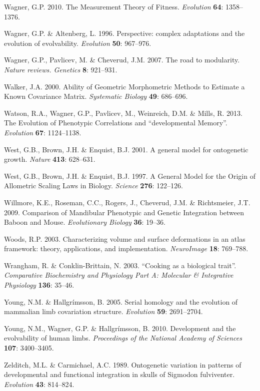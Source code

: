 \documentclass[12pt,twoside]{report}
\begin{document}
Wagner, G.P. 2010. The Measurement Theory of Fitness. \emph{Evolution}
\textbf{64}: 1358--1376.

Wagner, G.P. \& Altenberg, L. 1996. Perspective: complex adaptations and
the evolution of evolvability. \emph{Evolution} \textbf{50}: 967--976.

Wagner, G.P., Pavlicev, M. \& Cheverud, J.M. 2007. The road to
modularity. \emph{Nature reviews. Genetics} \textbf{8}: 921--931.

Walker, J.A. 2000. Ability of Geometric Morphometric Methods to Estimate
a Known Covariance Matrix. \emph{Systematic Biology} \textbf{49}:
686--696.

Watson, R.A., Wagner, G.P., Pavlicev, M., Weinreich, D.M. \& Mills, R.
2013. The Evolution of Phenotypic Correlations and ``developmental
Memory''. \emph{Evolution} \textbf{67}: 1124--1138.

West, G.B., Brown, J.H. \& Enquist, B.J. 2001. A general model for
ontogenetic growth. \emph{Nature} \textbf{413}: 628--631.

West, G.B., Brown, J.H. \& Enquist, B.J. 1997. A General Model for the
Origin of Allometric Scaling Laws in Biology. \emph{Science}
\textbf{276}: 122--126.

Willmore, K.E., Roseman, C.C., Rogers, J., Cheverud, J.M. \&
Richtsmeier, J.T. 2009. Comparison of Mandibular Phenotypic and Genetic
Integration between Baboon and Mouse. \emph{Evolutionary Biology}
\textbf{36}: 19--36.

Woods, R.P. 2003. Characterizing volume and surface deformations in an
atlas framework: theory, applications, and implementation.
\emph{NeuroImage} \textbf{18}: 769--788.

Wrangham, R. \& Conklin-Brittain, N. 2003. ``Cooking as a biological
trait''. \emph{Comparative Biochemistry and Physiology Part A: Molecular
\& Integrative Physiology} \textbf{136}: 35--46.

Young, N.M. \& Hallgrímsson, B. 2005. Serial homology and the evolution
of mammalian limb covariation structure. \emph{Evolution} \textbf{59}:
2691--2704.

Young, N.M., Wagner, G.P. \& Hallgrímsson, B. 2010. Development and the
evolvability of human limbs. \emph{Proceedings of the National Academy
of Sciences} \textbf{107}: 3400--3405.

Zelditch, M.L. \& Carmichael, A.C. 1989. Ontogenetic variation in
patterns of developmental and functional integration in skulls of
Sigmodon fulviventer. \emph{Evolution} \textbf{43}: 814--824.
\end{document}
